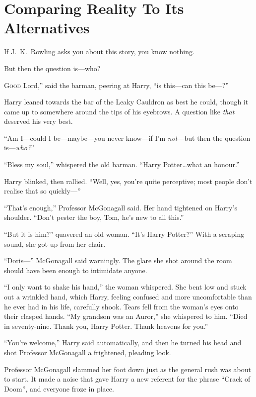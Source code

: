 \chapter{Comparing Reality To Its Alternatives}

\begin{chapterOpeningAuthorNote}
If J.~K.~Rowling asks you about this story, you know nothing.
\end{chapterOpeningAuthorNote}
\begin{chapterOpeningQuote}
But then the question is—who?
\end{chapterOpeningQuote}

\lettrine[ante=“]{G}{ood} Lord,” said the barman, peering at Harry, “is this—can this be—?”

Harry leaned towards the bar of the Leaky Cauldron as best he could, though it came up to somewhere around the tips of his eyebrows. A question like \emph{that} deserved his very best.

“Am I—could I be—maybe—you never know—if I’m \emph{not}—but then the question is—\emph{who?}”

“Bless my soul,” whispered the old barman.
“Harry Potter…what an honour.”

Harry blinked, then rallied.
“Well, yes, you’re quite perceptive; most people don’t realise that so quickly—”

“That’s enough,” Professor McGonagall said. Her hand tightened on Harry’s shoulder.
“Don’t pester the boy, Tom, he’s new to all this.”

“But it is him?” quavered an old woman.
“It’s Harry Potter?” With a scraping sound, she got up from her chair.

“Doris—” McGonagall said warningly. The glare she shot around the room should have been enough to intimidate anyone.

“I only want to shake his hand,” the woman whispered. She bent low and stuck out a wrinkled hand, which Harry, feeling confused and more uncomfortable than he ever had in his life, carefully shook. Tears fell from the woman’s eyes onto their clasped hands.
“My grandson was an Auror,” she whispered to him.
“Died in seventy-nine. Thank you, Harry Potter. Thank heavens for you.”

“You’re welcome,” Harry said automatically, and then he turned his head and shot Professor McGonagall a frightened, pleading look.

Professor McGonagall slammed her foot down just as the general rush was about to start. It made a noise that gave Harry a new referent for the phrase
“Crack of Doom”, and everyone froze in place.

